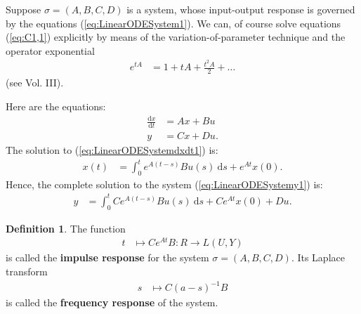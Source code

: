 \documentclass[12pt]{book}
\theoremstyle{plain}
\theoremstyle{definition}
\newtheorem{definition}{Definition}[section]
\newcommand{\dd}[1]{\mathrm{d}#1}
\begin{document}
Suppose $\sigma = (A, B, C, D)$ is a system, whose input-output response is governed by the equations (\ref{eq:LinearODESystem1}).
We can, of course solve equations (\ref{eq:C1,1}) explicitly by means of the variation-of-parameter technique and the operator exponential
\begin{align}
    e^{tA} &= 1 + tA + \frac{t^2A}{2} + \dots
\end{align}
(see Vol. III).

Here are the equations:
\begin{align}
    \frac{\dd{x}}{\dd{t}} &= Ax + Bu \label{eq:LinearODESystemdxdt1} \\
    y &= Cx + Du. \label{eq:LinearODESystemy1}
\end{align}
The solution to (\ref{eq:LinearODESystemdxdt1}) is:
\begin{align}
    x(t) &= \int_0^t e^{A(t-s)}Bu(s)\ \dd{s} + e^{At}x(0).
\end{align}
Hence, the complete solution to the system (\ref{eq:LinearODESystemy1}) is:
\begin{align} \label{eq:LinearODESystemy1Solution1}
    y &= \int_0^t Ce^{A(t-s)}Bu(s)\ \dd{s} + Ce^{At}x(0) + Du.
\end{align}

\begin{definition}
    The function
    \begin{align} \label{eq:ImpulseResponse1}
        t &\mapsto Ce^{At}B: R \to L(U, Y)
    \end{align}
    is called the \textbf{impulse response} for the system $\sigma = (A, B, C, D)$.
    Its Laplace transform
    \begin{align} \label{eq:FreqResponse1}
        s &\mapsto C(a-s)^{-1}B
    \end{align}
    is called the \textbf{frequency response} of the system.
\end{definition}
\end{document}
